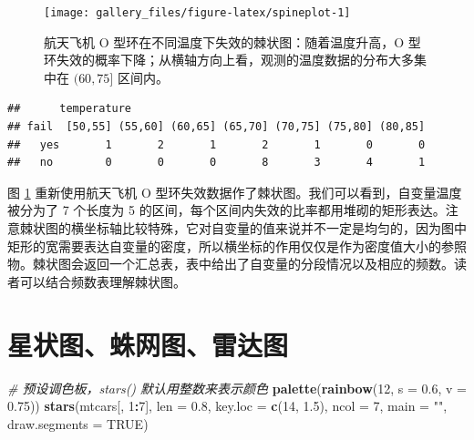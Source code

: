 \documentclass[
  b5paper,
  UTF8,twoside]{book}
\newenvironment{Shaded}{\begin{snugshade}}{\end{snugshade}}
\newcommand{\AttributeTok}[1]{\textcolor[rgb]{0.13,0.29,0.53}{#1}}
\newcommand{\CommentTok}[1]{\textcolor[rgb]{0.56,0.35,0.01}{\textit{#1}}}
\newcommand{\ConstantTok}[1]{\textcolor[rgb]{0.56,0.35,0.01}{#1}}
\newcommand{\DecValTok}[1]{\textcolor[rgb]{0.00,0.00,0.81}{#1}}
\newcommand{\FloatTok}[1]{\textcolor[rgb]{0.00,0.00,0.81}{#1}}
\newcommand{\FunctionTok}[1]{\textcolor[rgb]{0.13,0.29,0.53}{\textbf{#1}}}
\newcommand{\NormalTok}[1]{#1}
\newcommand{\SpecialCharTok}[1]{\textcolor[rgb]{0.81,0.36,0.00}{\textbf{#1}}}
\newcommand{\StringTok}[1]{\textcolor[rgb]{0.31,0.60,0.02}{#1}}
\begin{document}
\begin{figure}

{\centering \texttt{[image: gallery\_files/figure-latex/spineplot-1]} 

}

\caption[航天飞机 O 型环在不同温度下失效的棘状图]{航天飞机 O 型环在不同温度下失效的棘状图：随着温度升高，O 型环失效的概率下降；从横轴方向上看，观测的温度数据的分布大多集中在 \((60, 75]\) 区间内。}\label{fig:spineplot}
\end{figure}

\begin{verbatim}
##      temperature
## fail  [50,55] (55,60] (60,65] (65,70] (70,75] (75,80] (80,85]
##   yes       1       2       1       2       1       0       0
##   no        0       0       0       8       3       4       1
\end{verbatim}

图 \ref{fig:spineplot} 重新使用航天飞机 O 型环失效数据作了棘状图。我们可以看到，自变量温度被分为了 7 个长度为 5 的区间，每个区间内失效的比率都用堆砌的矩形表达。注意棘状图的横坐标轴比较特殊，它对自变量的值来说并不一定是均匀的，因为图中矩形的宽需要表达自变量的密度，所以横坐标的作用仅仅是作为密度值大小的参照物。棘状图会返回一个汇总表，表中给出了自变量的分段情况以及相应的频数。读者可以结合频数表理解棘状图。

\section{星状图、蛛网图、雷达图}\label{sec:stars}





\begin{Shaded}
\begin{Highlighting}[]
\CommentTok{\# 预设调色板，stars() 默认用整数来表示颜色}
\FunctionTok{palette}\NormalTok{(}\FunctionTok{rainbow}\NormalTok{(}\DecValTok{12}\NormalTok{, }\AttributeTok{s =} \FloatTok{0.6}\NormalTok{, }\AttributeTok{v =} \FloatTok{0.75}\NormalTok{))}
\FunctionTok{stars}\NormalTok{(mtcars[, }\DecValTok{1}\SpecialCharTok{:}\DecValTok{7}\NormalTok{], }\AttributeTok{len =} \FloatTok{0.8}\NormalTok{, }\AttributeTok{key.loc =} \FunctionTok{c}\NormalTok{(}\DecValTok{14}\NormalTok{, }\FloatTok{1.5}\NormalTok{), }\AttributeTok{ncol =} \DecValTok{7}\NormalTok{, }
      \AttributeTok{main =} \StringTok{""}\NormalTok{, }\AttributeTok{draw.segments =} \ConstantTok{TRUE}\NormalTok{)}
\end{Highlighting}
\end{Shaded}
\end{document}
